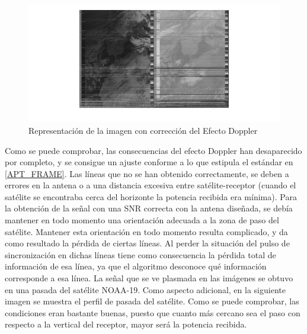 \documentclass[a4paper,openright,12pt]{article}
\begin{document}
 \begin{figure}[hbtp]
 \centering
 \includegraphics[width = 17cm]{imagenes/31_01_synch.png}
 \caption{Representación de la imagen con corrección del Efecto Doppler}
 \label{apt_corrected}
 \end{figure}
 
 Como se puede comprobar, las consecuencias del efecto Doppler han desaparecido por completo, y se consigue un ajuste conforme a lo que estipula el estándar en \ref{APT_FRAME}. Las líneas que no se han obtenido correctamente, se deben a errores en la antena o a una distancia excesiva entre satélite-receptor (cuando el satélite se encontraba cerca del horizonte la potencia recibida era mínima). Para la obtención de la señal con una SNR correcta con la antena diseñada, se debía mantener en todo momento una orientación adecuada a la zona de paso del satélite. Mantener esta orientación en todo momento resulta complicado, y da como resultado la pérdida de ciertas líneas. Al perder la situación del pulso de sincronización en   dichas líneas tiene como consecuencia la pérdida total de información de esa línea, ya que el algoritmo desconoce qué información corresponde a esa línea. La señal que se ve plasmada en las imágenes se obtuvo en una pasada del satélite NOAA-19. Como aspecto adicional, en la siguiente imagen se muestra el perfil de pasada del satélite. Como se puede comprobar, las condiciones eran bastante buenas, puesto que cuanto más cercano sea el paso con respecto a la  vertical del receptor, mayor será la potencia recibida.
 
\end{document}
